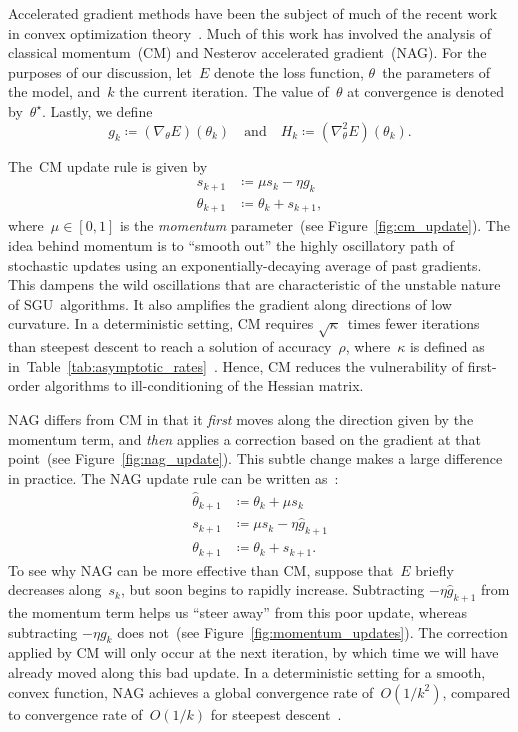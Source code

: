 \documentclass[11pt,a4paper]{article}
\numberwithin{equation}{section}
\begin{document}
Accelerated gradient methods have been the subject of much of the recent work in
convex optimization theory~\citep{sutskever2013importance}. Much of this work
has involved the analysis of classical momentum~(CM) and Nesterov accelerated
gradient~(NAG). For the purposes of our discussion, let~$E$ denote the loss
function, $\theta$~the parameters of the model, and~$k$ the current iteration.
The value of~$\theta$ at convergence is denoted by~$\theta^\star$. Lastly, we
define
\[
	g_k \coloneqq (\nabla_\theta E)(\theta_k)
	\quad\text{and}\quad
	H_k \coloneqq (\nabla^2_\theta E)(\theta_k).
\]

The~CM update rule is given by
\begin{align*}
	s_{k + 1} &\coloneqq \mu s_k - \eta g_k \\
	\theta_{k + 1} &\coloneqq \theta_k + s_{k + 1},
\end{align*}
where~$\mu \in [0, 1]$ is the \emph{momentum} parameter~(see
Figure~\ref{fig:cm_update}). The idea behind momentum is to ``smooth out'' the
highly oscillatory path of stochastic updates using an exponentially-decaying
average of past gradients. This dampens the wild oscillations that are
characteristic of the unstable nature of SGU~algorithms. It also amplifies the
gradient along directions of low curvature. In a deterministic setting, CM
requires $\sqrt{\kappa}$~times fewer iterations than steepest descent to reach a
solution of accuracy~$\rho$, where~$\kappa$ is defined as
in~Table~\ref{tab:asymptotic_rates}~\citep{sutskever2013importance}. Hence, CM
reduces the vulnerability of first-order algorithms to ill-conditioning of the
Hessian matrix.

NAG differs from CM in that it \emph{first} moves along the direction given by
the momentum term, and \emph{then} applies a correction based on the gradient at
that point~(see Figure~\ref{fig:nag_update}). This subtle change makes a large
difference in practice. The NAG update rule can be written
as~\citep{sutskever2013importance}:
\begin{align*}
	\hat{\theta}_{k + 1} &\coloneqq \theta_k + \mu s_k \\
	s_{k + 1}            &\coloneqq \mu s_k - \eta \hat{g}_{k + 1} \\
	\theta_{k + 1}       &\coloneqq \theta_k + s_{k + 1}.
\end{align*}
To see why NAG can be more effective than CM, suppose that~$E$ briefly decreases
along~$s_k$, but soon begins to rapidly increase. Subtracting $-\eta \hat{g}_{k
+ 1}$ from the momentum term helps us ``steer away'' from this poor update,
whereas subtracting $-\eta g_k$ does not~(see
Figure~\ref{fig:momentum_updates}). The correction applied by CM will only occur
at the next iteration, by which time we will have already moved along this bad
update. In a deterministic setting for a smooth, convex function, NAG achieves a
global convergence rate of~$O(1 / k^2)$, compared to convergence rate of~$O(1 /
k)$ for steepest descent~\citep{sutskever2013importance}.
\end{document}
